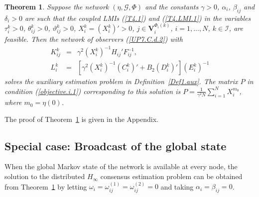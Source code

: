 \documentclass[a4paper,twocolumn]{autart}
\newtheorem{theorem}{Theorem}
\begin{document}
\begin{theorem}\label{T.aux}
Suppose the network $(\eta,\mathcal{G},\Phi)$ and the constants $\gamma>0$,
$\alpha_i$, $\beta_{ij}$ and $\delta_i>0$ are such that 
the coupled LMIs (\ref{T4.1}) and (\ref{T4.LMI.1})
in the variables $\tau_i^k>0$, $\theta_{ij}^k>0$, $\vartheta_{ij}^k>0$,
$X_i^k=(X_i^k)'>0$, $j\in \mathbf{V}_i^{\Phi_i(k)}$,  
$i=1,\ldots,N$, $k\in\mathcal{I}$, are feasible. 
Then the network of observers (\ref{UP7.C.d.2}) with
\begin{eqnarray}
 K_{ij}^k&=&\gamma^2(X_i^k)^{-1}H_{ij}'F_{ij}^{-1}, \label{Kim} \nonumber \\
 L_i^k&=&\left[\gamma^2(X_i^k)^{-1}(C_i^k)'+
B_2 (D_i^k)'\right](E_i^k)^{-1} \label{Lim}
\end{eqnarray}
solves the auxiliary estimation problem in Definition~\ref{Def1.aux}. The
matrix $P$ in condition (\ref{objective.i.1}) 
corresponding to this solution is $P=\frac{1}{\gamma^2N}\sum_{i=1}^NX_i^{m_0}$,
where $m_0=\eta(0)$.  
\end{theorem}

The proof of Theorem~\ref{T.aux} is given in the Appendix. 

\subsection{Special case: Broadcast of the global state}   

When the global Markov state of the network is available at
every node, the solution to the distributed
$H_\infty$ consensus estimation problem can be obtained from
Theorem~\ref{T.aux} by letting  
$\omega_i=\omega_{ij}^{(1)}=\omega_{ij}^{(2)}=0$ and taking
$\alpha_i=\beta_{ij}=0$.
\end{document}
